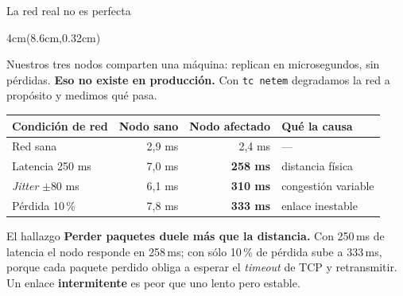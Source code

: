 \documentclass[aspectratio=169,11pt]{beamer}
\newcommand{\quien}[1]{%
  \begin{textblock*}{4cm}(8.6cm,0.32cm)
    \tiny\textcolor{white}{\textbf{#1}}
  \end{textblock*}}
\begin{document}
\begin{frame}{La red real no es perfecta}
\quien{Simón}
\footnotesize
Nuestros tres nodos comparten una máquina: replican en microsegundos, sin
pérdidas. \textbf{Eso no existe en producción.} Con \texttt{tc netem} degradamos
la red a propósito y medimos qué pasa.

\vspace{8pt}
\begin{center}\small
\begin{tabular}{@{}lrrl@{}}
\toprule
\textbf{Condición de red} & \textbf{Nodo sano} & \textbf{Nodo afectado} & \textbf{Qué la causa} \\
\midrule
Red sana & 2{,}9 ms & 2{,}4 ms & — \\
Latencia 250 ms & 7{,}0 ms & \textbf{258 ms} & distancia física \\
\emph{Jitter} $\pm$80 ms & 6{,}1 ms & \textbf{310 ms} & congestión variable \\
Pérdida 10\,\% & 7{,}8 ms & \textcolor{cmAmbar}{\textbf{333 ms}} & enlace inestable \\
\bottomrule
\end{tabular}
\end{center}

\vspace{7pt}
\begin{block}{\small El hallazgo}
\footnotesize
\textbf{Perder paquetes duele más que la distancia.} Con 250\,ms de latencia el
nodo responde en 258\,ms; con sólo 10\,\% de pérdida sube a 333\,ms, porque cada
paquete perdido obliga a esperar el \emph{timeout} de TCP y retransmitir.
Un enlace \textbf{intermitente} es peor que uno lento pero estable.
\end{block}
\end{frame}
\end{document}
